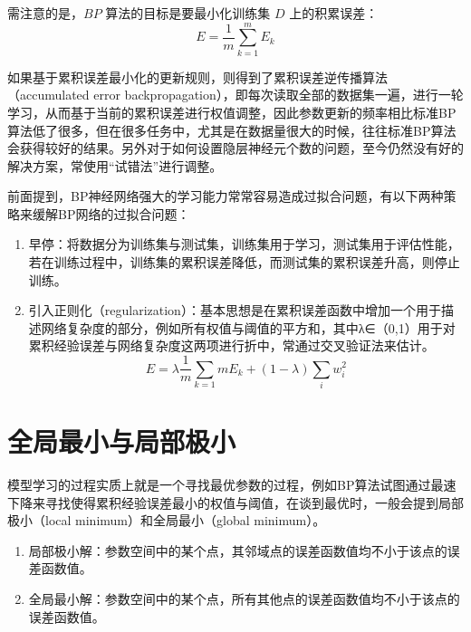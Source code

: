 \documentclass[12pt, a4paper]{article} %
\begin{document}
需注意的是，$BP$ 算法的目标是要最小化训练集 $D$ 上的积累误差：
\begin{equation*}
    E = \frac{1}{m} \sum_{k = 1}^{m} E_k
\end{equation*}

如果基于累积误差最小化的更新规则，则得到了累积误差逆传播算法（accumulated error backpropagation），即每次读取全部的数据集一遍，进行一轮学习，从而基于当前的累积误差进行权值调整，因此参数更新的频率相比标准BP算法低了很多，但在很多任务中，尤其是在数据量很大的时候，往往标准BP算法会获得较好的结果。另外对于如何设置隐层神经元个数的问题，至今仍然没有好的解决方案，常使用“试错法”进行调整。

前面提到，BP神经网络强大的学习能力常常容易造成过拟合问题，有以下两种策略来缓解BP网络的过拟合问题：

\begin{enumerate}[\hspace*{2em} i.]
    \item 早停：将数据分为训练集与测试集，训练集用于学习，测试集用于评估性能，若在训练过程中，训练集的累积误差降低，而测试集的累积误差升高，则停止训练。
    \item 引入正则化（regularization）：基本思想是在累积误差函数中增加一个用于描述网络复杂度的部分，例如所有权值与阈值的平方和，其中λ∈（0,1）用于对累积经验误差与网络复杂度这两项进行折中，常通过交叉验证法来估计。
    \begin{equation*}
        E = \lambda \frac{1}{m} \sum_{k = 1}{m} E_k + (1 - \lambda) \sum_{i} w_i^2
    \end{equation*}
\end{enumerate}

\section{全局最小与局部极小}

模型学习的过程实质上就是一个寻找最优参数的过程，例如BP算法试图通过最速下降来寻找使得累积经验误差最小的权值与阈值，在谈到最优时，一般会提到局部极小（local minimum）和全局最小（global minimum）。

\begin{enumerate}[\hspace*{2em} i.]
    \item 局部极小解：参数空间中的某个点，其邻域点的误差函数值均不小于该点的误差函数值。
    \item 全局最小解：参数空间中的某个点，所有其他点的误差函数值均不小于该点的误差函数值。
\end{enumerate}
\end{document}
